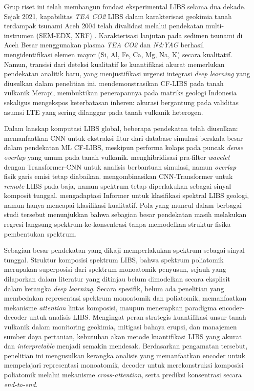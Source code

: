 \documentclass[12pt, a4paper]{article}
\begin{document}
Grup riset ini telah membangun fondasi eksperimental LIBS selama dua dekade. Sejak 2021, kapabilitas \textit{TEA CO2} LIBS dalam karakterisasi geokimia tanah terdampak tsunami Aceh 2004 telah divalidasi melalui pendekatan multi-instrumen (SEM-EDX, XRF) \citep{sari_new_2021, ramli_elemental_2023-1, mitaphonna_x-ray_2023}. Karakterisasi lanjutan pada sedimen tsunami di Aceh Besar \citep{mitaphonna_characteristics_2023, mitaphonna_preliminary_2024} menggunakan plasma \textit{TEA CO2} dan \textit{Nd:YAG} \citep{mitaphonna_pulsed_2024} berhasil mengidentifikasi elemen mayor (Si, Al, Fe, Ca, Mg, Na, K) secara kualitatif. Namun, transisi dari deteksi kualitatif ke kuantifikasi akurat memerlukan pendekatan analitik baru, yang menjustifikasi urgensi integrasi \textit{deep learning} yang diusulkan dalam penelitian ini. \citet{khumaeni_analysis_2025} mendemonstrasikan CF-LIBS pada tanah vulkanik Merapi, membuktikan penerapannya pada matriks geologi Indonesia sekaligus mengekspos keterbatasan inheren: akurasi bergantung pada validitas asumsi LTE yang sering dilanggar pada tanah vulkanik heterogen.

Dalam lanskap komputasi LIBS global, beberapa pendekatan telah diusulkan: \citet{favre2025b} memanfaatkan CNN untuk ekstraksi fitur dari database simulasi berskala besar dalam pendekatan ML CF-LIBS, meskipun performa kolaps pada puncak \textit{dense overlap} yang umum pada tanah vulkanik. \citet{wang2024} menghibridisasi pra-filter \textit{wavelet} dengan Transformer-CNN untuk analisis berbantuan simulasi, namun \textit{overlap} fisik garis emisi tetap diabaikan. \citet{liu2026} mengombinasikan CNN-Transformer untuk \textit{remote} LIBS pada baja, namun spektrum tetap diperlakukan sebagai sinyal komposit tunggal. \citet{walidain_informer-based_2026} mengadaptasi Informer untuk klasifikasi spektral LIBS geologi, namun hanya mencapai klasifikasi kualitatif. Pola yang muncul dalam berbagai studi tersebut menunjukkan bahwa sebagian besar pendekatan masih melakukan regresi langsung spektrum-ke-konsentrasi tanpa memodelkan struktur fisika pembentukan spektrum.

Sebagian besar pendekatan yang dikaji memperlakukan spektrum sebagai sinyal tunggal. Struktur komposisi spektrum LIBS, bahwa spektrum poliatomik merupakan superposisi dari spektrum monoatomik penyusun, sejauh yang dilaporkan dalam literatur yang ditinjau belum dimodelkan secara eksplisit dalam kerangka \textit{deep learning}. Secara spesifik, belum ada penelitian yang membedakan representasi spektrum monoatomik dan poliatomik, memanfaatkan mekanisme \textit{attention} lintas komposisi, maupun menerapkan paradigma encoder-decoder untuk analisis LIBS. Mengingat peran strategis kuantifikasi unsur tanah vulkanik dalam monitoring geokimia, mitigasi bahaya erupsi, dan manajemen sumber daya pertanian, kebutuhan akan metode kuantifikasi LIBS yang akurat dan \textit{interpretable} menjadi semakin mendesak. Berdasarkan pengamatan tersebut, penelitian ini mengusulkan kerangka analisis yang memanfaatkan encoder untuk mempelajari representasi monoatomik, decoder untuk merekonstruksi komposisi poliatomik melalui mekanisme \textit{cross-attention}, serta prediksi konsentrasi secara \textit{end-to-end}.
\end{document}
